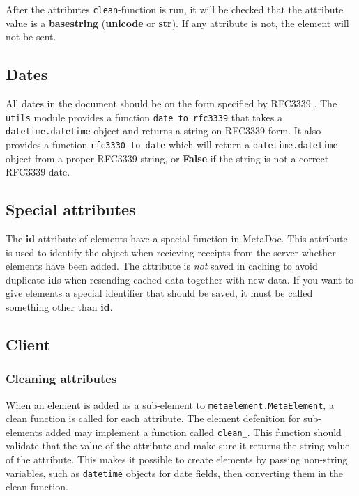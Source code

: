 \documentclass[titlepage, a4paper,10pt]{article}
\begin{document}
After the attributes \texttt{clean}-function is run, it will be checked that
the attribute value is a \textbf{basestring} (\textbf{unicode} or
\textbf{str}). If any attribute is not, the element will not be sent. 

\subsection{Dates}

All dates in the document should be on the form specified by RFC3339 
\cite{rfc3339}. The \texttt{utils} module provides a function 
\texttt{date\_to\_rfc3339} that takes a \texttt{datetime.datetime} object and 
returns a string on RFC3339 form. It also provides a function
\texttt{rfc3330\_to\_date} which will return a \texttt{datetime.datetime}
object from a proper RFC3339 string, or \textbf{False} if the string is not a
correct RFC3339 date.

\subsection{Special attributes}

The \textbf{id} attribute of elements have a special function in MetaDoc. This 
attribute is used to identify the object when recieving receipts from the server 
whether elements have been added. The attribute is \textit{not} saved in caching 
to avoid duplicate \textbf{id}s when resending cached data together with new 
data. If you want to give elements a special identifier that should be saved, it 
must be called something other than \textbf{id}.

\subsection{Client}

\subsubsection{Cleaning attributes}

When an element is added as a sub-element to \texttt{metaelement.MetaElement}, a 
clean function is called for each attribute. The element defenition for 
sub-elements added may implement a function called 
\texttt{clean\_<attribute name>}. This function should validate that the value 
of the attribute and make sure it returns the string value of the attribute. 
This makes it possible to create elements by passing non-string variables, such 
as \texttt{datetime} objects for date fields, then converting them in the clean 
function. 
\end{document}
